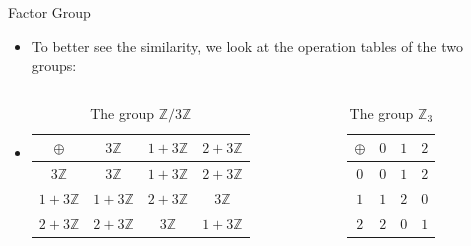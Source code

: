 \documentclass[ %
 10pt, xcolor={dvipsnames,svgnames,x11names,hyperref},
   hyperref={colorlinks=true,citecolor=green,linkcolor=DarkRed,urlcolor=ProcessBlue,anchorcolor=blue}
  ]{beamer}
\newenvironment{stepitemize}{\begin{itemize}[<+->]}{\end{itemize} }
\newcommand{\Z}{\mathbb{Z}}
\begin{document}
\begin{frame}{Factor Group}
\begin{stepitemize}
\item To better see the similarity, we look at the operation tables of the two groups:
\item[]
\begin{columns}
        \begin{column}{0.4\textwidth}
            \begin{table}
            \begin{tabular}{ c| c | c |c}
$\oplus$  & {\color{darkgray} $3\Z$} & {\color{blue} $1+3\Z$} &  {\color{red} $2+3\Z$}\\
\hline
{\color{darkgray} $3\Z$}&{\color{darkgray} $3\Z$} & {\color{blue} $1+3\Z$} & {\color{red} $2+3\Z$}\\
\hline
{\color{blue} $1+3\Z$} &{\color{blue} $1+3\Z$} & {\color{red} $2+3\Z$} & {\color{darkgray} $3\Z$}\\
\hline
{\color{red} $2+3\Z$}&{\color{red} $2+3\Z$} & {\color{darkgray} $3\Z$} & {\color{blue} $1+3\Z$}
\end{tabular}

            \caption{The group $\Z/3\Z$}
            \end{table}
        \end{column}
        \begin{column}{0.3\textwidth}
            \begin{table}
            \begin{tabular}{ c| c | c |c}
$\oplus$  & {\color{darkgray} $0$} & {\color{blue} $1$} &  {\color{red} $2$}\\
\hline
{\color{darkgray} $0$}&{\color{darkgray} $0$} & {\color{blue} $1$} & {\color{red} $2$}\\
\hline
{\color{blue} $1$} &{\color{blue} $1$} & {\color{red} $2$} & {\color{darkgray} $0$}\\
\hline
{\color{red} $2$}&{\color{red} $2$} & {\color{darkgray} $0$} & {\color{blue} $1$}
\end{tabular}
            \caption{The group $\Z_3$}
            \end{table}
        \end{column}
    \end{columns}

\end{stepitemize}

\end{frame}
\end{document}

